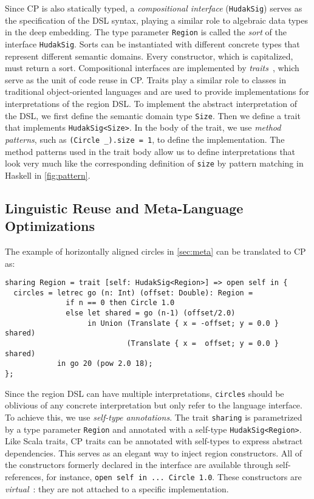 \noindent
Since CP is also statically typed, a \emph{compositional interface}
(\lstinline{HudakSig}) serves as the specification of the DSL syntax, playing a
similar role to algebraic data types in the deep embedding. The type parameter
\lstinline{Region} is called the \emph{sort} of the interface
\lstinline{HudakSig}. Sorts can be instantiated with different concrete types
that represent different semantic domains. Every constructor, which is
capitalized, must return a sort. Compositional interfaces are implemented by
\emph{traits}~\citep{ducasse2006traits,bi2018typed}, which serve as the unit of
code reuse in CP. Traits play a similar role to classes in traditional
object-oriented languages and are used to provide implementations for
interpretations of the region DSL. To implement the abstract interpretation of
the DSL, we first define the semantic domain type \lstinline{Size}. Then we
define a trait that implements \lstinline{HudakSig<Size>}. In the body of the
trait, we use \emph{method patterns}, such as \lstinline{(Circle _).size = 1},
to define the implementation. The method patterns used in the trait body allow
us to define interpretations that look very much like the corresponding
definition of \lstinline{size} by pattern matching in Haskell in
\autoref{fig:pattern}.

\subsection{Linguistic Reuse and Meta-Language Optimizations} \label{sec:sharing}

The example of horizontally aligned circles in \autoref{sec:meta} can be
translated to CP as:

\begin{lstlisting}
sharing Region = trait [self: HudakSig<Region>] => open self in {
  circles = letrec go (n: Int) (offset: Double): Region =
              if n == 0 then Circle 1.0
              else let shared = go (n-1) (offset/2.0)
                   in Union (Translate { x = -offset; y = 0.0 } shared)
                            (Translate { x =  offset; y = 0.0 } shared)
            in go 20 (pow 2.0 18);
};
\end{lstlisting}

\noindent
Since the region DSL can have multiple interpretations, \lstinline{circles}
should be oblivious of any concrete interpretation but only refer to the
language interface. To achieve this, we use \emph{self-type annotations}. The
trait \lstinline{sharing} is parametrized by a type parameter \lstinline{Region}
and annotated with a self-type \lstinline{HudakSig<Region>}. Like Scala traits,
CP traits can be annotated with self-types to express abstract dependencies.
This serves as an elegant way to inject region constructors. All of the
constructors formerly declared in the interface are available through
self-references, for instance, \lstinline{open self in ... Circle 1.0}. These
constructors are \emph{virtual}~\citep{madsen1989virtual,ernst2006virtual}: they
are not attached to a specific implementation.

